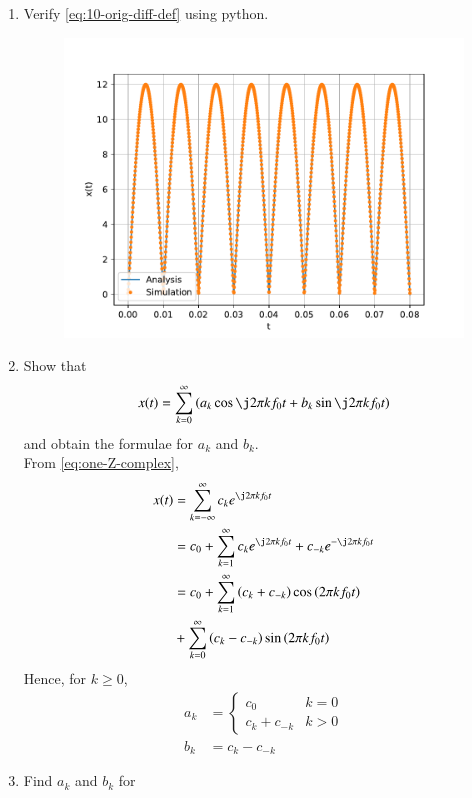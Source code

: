 \documentclass[journal,12pt,twocolumn]{IEEEtran}
\renewcommand\thesection{\arabic{section}}
\begin{document}
\begin{enumerate}[label=\thesection.\arabic*,ref=\thesection.\theenumi]
\item Verify
\eqref{eq:10-orig-diff-def}
using python. \\
\solution
\begin{figure}[!ht]
\includegraphics[width=\columnwidth]{figs/2.3.pdf}
\caption{}
\label{fig:ver-complex}
\end{figure}
\item Show that
\begin{align}
x(t) = \sum_{k = 0}^{\infty}\brak{a_k\cos{\j2\pi kf_0 t}+b_k\sin{\j2\pi kf_0 t}}
\label{eq:one-Z-real}
\end{align}
and obtain the formulae for $a_k$ and $b_k$. \\
\solution From \eqref{eq:one-Z-complex},
\begin{align}
x(t) &= \sum_{k = -\infty}^{\infty}c_ke^{\j2\pi kf_0 t} \\
&= c_0 + \sum_{k = 1}^{\infty}c_ke^{\j2\pi kf_0t} + c_{-k}e^{-\j2\pi kf_0t} \\
&= c_0 + \sum_{k = 1}^{\infty}\brak{c_k + c_{-k}}\cos\brak{2\pi kf_0t}  \nonumber \\
&+ \sum_{k = 0}^{\infty}\brak{c_k - c_{-k}}\sin\brak{2\pi kf_0t}
\end{align}
Hence, for $k \ge 0$,
\begin{align}
a_k &=
\begin{cases}
c_0 & k = 0 \\
c_k + c_{-k} & k > 0
\end{cases} \label{eq:ak} \\
b_k &= c_k - c_{-k}
\label{eq:bk}
\end{align}
\item Find $a_k$ and $b_k$ for

\end{enumerate}
\end{document}
